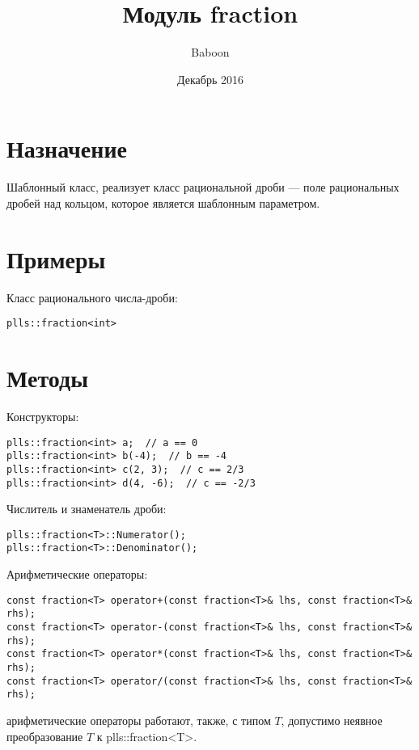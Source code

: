 \documentclass{article}
\title{Модуль fraction}
\author{Baboon}
\date{Декабрь 2016}
\begin{document}
\maketitle

\lstset{language=C++}

\section{Назначение}

Шаблонный класс, реализует класс рациональной дроби --- поле рациональных дробей над кольцом, которое является шаблонным параметром.

\section{Примеры}

Класс рационального числа-дроби:

\begin{lstlisting}
plls::fraction<int>
\end{lstlisting}

\section{Методы}

Конструкторы:

\begin{lstlisting}
plls::fraction<int> a;  // a == 0
plls::fraction<int> b(-4);  // b == -4
plls::fraction<int> c(2, 3);  // c == 2/3
plls::fraction<int> d(4, -6);  // c == -2/3
\end{lstlisting}

Числитель и знаменатель дроби:

\begin{lstlisting}
plls::fraction<T>::Numerator();
plls::fraction<T>::Denominator();
\end{lstlisting}

Арифметические операторы:

\begin{lstlisting}
const fraction<T> operator+(const fraction<T>& lhs, const fraction<T>& rhs);
const fraction<T> operator-(const fraction<T>& lhs, const fraction<T>& rhs);
const fraction<T> operator*(const fraction<T>& lhs, const fraction<T>& rhs);
const fraction<T> operator/(const fraction<T>& lhs, const fraction<T>& rhs);
\end{lstlisting}

арифметические операторы работают, также, с типом $T$, допустимо неявное преобразование $T$ к plls::fraction<T>.
\end{document}
